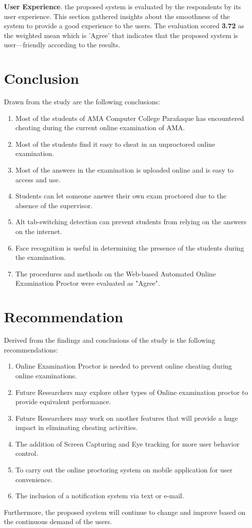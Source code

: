 \textbf{User Experience}.
the proposed system is evaluated by the respondents by its user experience.
This section gathered insights about the smoothness of the system to provide a good experience to the users.
The evaluation scored \textbf{3.72} as the weighted mean which is 'Agree' that indicates that the proposed system is user—friendly according to the results.

\section{Conclusion}

Drawn from the study are the following conclusions:

\begin{enumerate}
   \item Most of the students of AMA Computer College Parañaque has encountered cheating during the current online examination of AMA.
   \item Most of the students find it easy to cheat in an unproctored online examination.
   \item Most of the answers in the examination is uploaded online and is easy to access and use.
   \item Students can let someone answer their own exam proctored due to the absence of the supervisor.
   \item Alt tab-switching detection can prevent students from relying on the answers on the internet.
   \item Face recognition is useful in determining the presence of the students during the examination.
   \item The procedures and methods on the Web-based Automated Online Examination Proctor were evaluated as "Agree".
\end{enumerate}

\section{Recommendation}

Derived from the findings and conclusions of the study is the following recommendations:

\begin{enumerate}
   \item Online Examination Proctor is needed to prevent online cheating during online examinations.
   \item Future Researchers may explore other types of Online examination proctor to provide equivalent performance.
   \item Future Researchers may work on another features that will provide a huge impact in eliminating cheating activities.
   \item The addition of Screen Capturing and Eye tracking for more user behavior control.
   \item To carry out the online proctoring system on mobile application for user convenience.
   \item The inclusion of a notification system via text or e-mail.
\end{enumerate}

Furthermore, the proposed system will continue to change and improve based on the continuous demand of the users.
